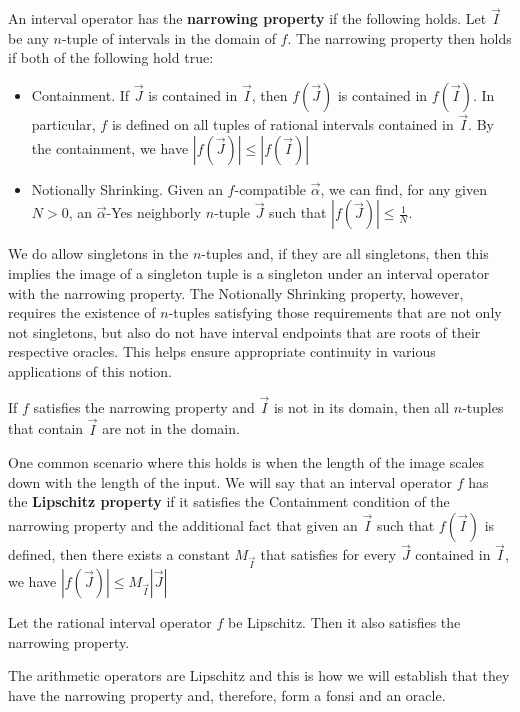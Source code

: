 \documentclass[12pt]{article}
\begin{document}
An interval operator has the \textbf{narrowing property} if the following holds. Let $\vec{I}$ be any $n$-tuple of intervals in the domain of $f$. The narrowing property then holds if both of the following hold true:
\begin{itemize}
    \item Containment. If $\vec{J}$ is contained in $\vec{I}$, then $f(\vec{J})$ is contained in $f(\vec{I})$. In particular, $f$ is defined on all tuples of rational intervals contained in $\vec{I}$. By the containment, we have $|f(\vec{J})| \leq |f(\vec{I})|$
    \item Notionally Shrinking. Given an $f$-compatible $\vec{\alpha}$, we can find, for any given $N>0$, an $\vec{\alpha}$-Yes neighborly $n$-tuple $\vec{J}$  such that $|f(\vec{J})| \leq \frac{1}{N}$.
\end{itemize}

We do allow singletons in the $n$-tuples and, if they are all singletons, then this implies the image of a singleton tuple is a singleton under an interval operator with the narrowing property. The Notionally Shrinking property, however, requires the existence of $n$-tuples satisfying those requirements that are not only not singletons, but also do not have interval endpoints that are roots of their respective oracles. This helps ensure appropriate continuity in various applications of this notion. 

If $f$ satisfies the narrowing property and $\vec{I}$ is not in its domain, then all $n$-tuples that contain $\vec{I}$ are not in the domain. 

One common scenario where this holds is when the length of the image scales down with the length of the input. We will say that an interval operator $f$ has the \textbf{Lipschitz property} if it satisfies the Containment condition of the narrowing property and the additional fact that given an $\vec{I}$ such that $f(\vec{I})$ is defined, then there exists a constant $M_{\vec{I}}$ that satisfies for every $\vec{J}$ contained in $\vec{I}$, we have $|f(\vec{J})| \leq M_{\vec{I}} |\vec{J}|$ 

\begin{proposition}
    Let the rational interval operator $f$ be Lipschitz. Then it also satisfies the narrowing property. 
\end{proposition}

The arithmetic operators are Lipschitz and this is how we will establish that they have the narrowing property and, therefore, form a fonsi and an oracle. 
\end{document}

